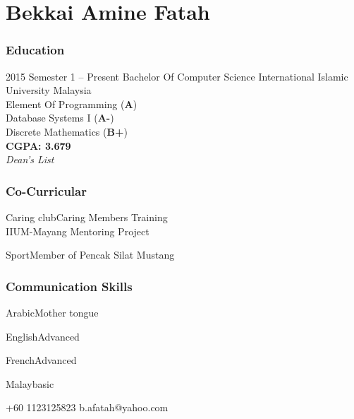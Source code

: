 \documentclass[11pt]{tccv}
\begin{document}
  
\part{Bekkai Amine Fatah}

\section{Education}

\begin{eventlist}

\item{2015 Semester 1 -- Present}
     {Bachelor Of Computer Science}
     {\large{International Islamic University Malaysia}}\\
     \small {Element Of Programming (\textbf{A})}\\
     \small{Database Systems I (\textbf{A-})}\\
     \small{Discrete Mathematics (\textbf{B+})}\\
     \textbf{CGPA: 3.679}\\
     \textit{Dean's List}
\end{eventlist}




\section{Co-Curricular}

\begin{factlist}
	\item{Caring club}{Caring Members Training\\
					  IIUM-Mayang Mentoring Project}
	\item{Sport}{Member of Pencak Silat Mustang}
	
\end{factlist}


\section{Communication Skills}

\begin{factlist}
	\item{Arabic}{Mother tongue}
	\item{English}{Advanced}
	\item{French}{Advanced}
	\item{Malay}{basic}
\end{factlist}


{+60 1123125823}
{b.afatah@yahoo.com}
\end{document}
